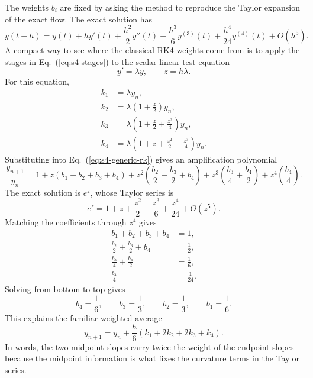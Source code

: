 \documentclass[aps,pra,preprint,superscriptaddress,nofootinbib]{revtex4-2}
\begin{document}
The weights \(b_i\) are fixed by asking the method to reproduce the Taylor expansion of the exact flow. The exact solution has
\begin{equation}
y(t+h)=y(t)+hy'(t)+\frac{h^2}{2}y''(t)
+\frac{h^3}{6}y^{(3)}(t)
+\frac{h^4}{24}y^{(4)}(t)+O(h^5).
\label{eq:s5-taylor}
\end{equation}
A compact way to see where the classical RK4 weights come from is to apply the stages in Eq.~(\ref{eq:s4-stages}) to the scalar linear test equation
\begin{equation}
y'=\lambda y,\qquad z=h\lambda.
\end{equation}
For this equation,
\begin{align}
k_1&=\lambda y_n,\\
k_2&=\lambda\left(1+\frac{z}{2}\right)y_n,\\
k_3&=\lambda\left(1+\frac{z}{2}+\frac{z^2}{4}\right)y_n,\\
k_4&=\lambda\left(1+z+\frac{z^2}{2}+\frac{z^3}{4}\right)y_n.
\end{align}
Substituting into Eq.~(\ref{eq:s4-generic-rk}) gives an amplification polynomial
\begin{equation}
\frac{y_{n+1}}{y_n}
=1+z(b_1+b_2+b_3+b_4)
+z^2\left(\frac{b_2}{2}+\frac{b_3}{2}+b_4\right)
+z^3\left(\frac{b_3}{4}+\frac{b_4}{2}\right)
+z^4\left(\frac{b_4}{4}\right).
\end{equation}
The exact solution is \(e^z\), whose Taylor series is
\begin{equation}
e^z=1+z+\frac{z^2}{2}+\frac{z^3}{6}+\frac{z^4}{24}+O(z^5).
\end{equation}
Matching the coefficients through \(z^4\) gives
\begin{align}
b_1+b_2+b_3+b_4&=1,\\
\frac{b_2}{2}+\frac{b_3}{2}+b_4&=\frac{1}{2},\\
\frac{b_3}{4}+\frac{b_4}{2}&=\frac{1}{6},\\
\frac{b_4}{4}&=\frac{1}{24}.
\end{align}
Solving from bottom to top gives
\begin{equation}
b_4=\frac{1}{6},\qquad b_3=\frac{1}{3},\qquad
b_2=\frac{1}{3},\qquad b_1=\frac{1}{6}.
\end{equation}
This explains the familiar weighted average
\begin{equation}
y_{n+1}=y_n+\frac{h}{6}(k_1+2k_2+2k_3+k_4).
\label{eq:s5-rk4}
\end{equation}
In words, the two midpoint slopes carry twice the weight of the endpoint slopes because the midpoint information is what fixes the curvature terms in the Taylor series.
\end{document}
